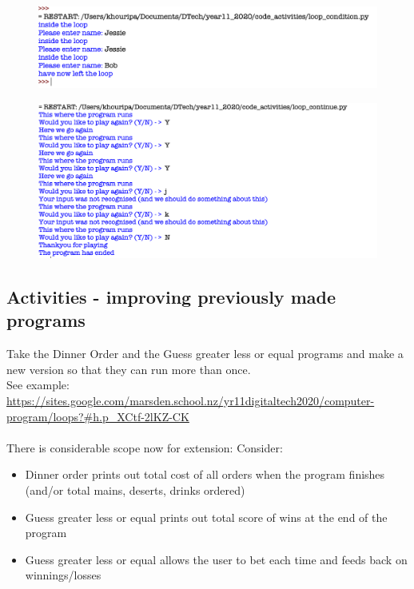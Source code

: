 \documentclass[a4paper,12pt]{article}
\begin{document}

\begin{figure} [!h]
	\centering
	\includegraphics[width=17cm]{screen_shots/loop_condition.png}
\end{figure}
\newpage

\begin{figure} [!h]
	\centering
	\includegraphics[width=17cm]{screen_shots/loop_continue.png}
\end{figure}
\newpage
\subsection{Activities - improving previously made programs}
Take the Dinner Order and the Guess greater less or equal programs  and make a new version so that they can run more than once.\\
See example: \url{https://sites.google.com/marsden.school.nz/yr11digitaltech2020/computer-program/loops?#h.p_XCtf-2lKZ-CK}\\\\
There is considerable scope now for extension:
Consider:
\begin{itemize}
\item Dinner order prints out total cost of all orders when the program finishes (and/or total mains, deserts, drinks ordered)
\item Guess greater less or equal prints out total score of wins at the end of the program
\item Guess greater less or equal allows the user to bet each time and feeds back on winnings/losses
\end{itemize}
\end{document}
